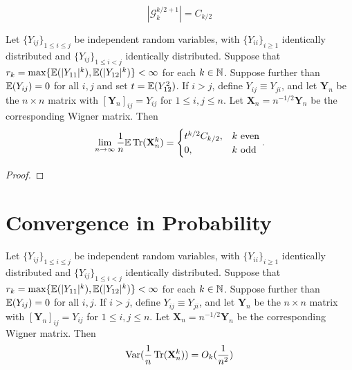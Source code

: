 \begin{proposition}
    \notready
    \label{prop:graph_Catalan_number}
  \[|\mathcal{G}^{k/2 + 1}_k| = C_{k/2}\]
\end{proposition}



%
%
%
%
%
%
%
%


\begin{proposition}
  \label{prop:matrix_moments_convergence}
  \notready
  Let $\{Y_{ij}\}_{1\le i\le j}$ be independent random variables, with $\{Y_{ii}\}_{i\ge 1}$ identically distributed and $\{Y_{ij}\}_{1\le i<j}$ identically distributed.  Suppose that $r_k = \max\{\mathbb{E}(|Y_{11}|^k),\mathbb{E}(|Y_{12}|^k)\} <\infty$ for each $k\in\mathbb{N}$.  Suppose further than $\mathbb{E}(Y_{ij})=0$ for all $i,j$ and set $t=\mathbb{E}(Y_{12}^2)$.  If $i>j$, define $Y_{ij} \equiv Y_{ji}$, and let $\mathbf{Y}_n$ be the $n\times n$ matrix with $[\mathbf{Y}_n]_{ij} = Y_{ij}$ for $1\le i,j\le n$.  Let $\mathbf{X}_n = n^{-1/2}\mathbf{Y}_n$ be the corresponding Wigner matrix.  Then
\[
\lim_{n\to\infty} \frac{1}{n}\mathbb{E}\operatorname{Tr}(\mathbf{X}_n^k) = \begin{cases}
  t^{k/2}C_{k/2}, & k\text{ even} \\
  0, & k\text{ odd}
\end{cases}.
\]
\end{proposition}

\begin{proof}
\notready
\end{proof}




\section{Convergence in Probability}

\begin{proposition}
  \label{prop:matrix_moments_convergence_probability}
  \notready
  Let $\{Y_{ij}\}_{1 \leq i \leq j}$ be independent random variables, with $\{Y_{ii}\}_{i\geq 1}$ identically distributed and $\{Y_{ij}\}_{1 \leq i < j}$ identically distributed. Suppose that $r_k = \max\{\mathbb{E}(|Y_{11}|^k),\mathbb{E}(|Y_{12}|^k)\} < \infty$ for each $k\in\mathbb{N}$. Suppose further than $\mathbb{E}(Y_{ij})=0$ for all $i,j$. If $i>j$, define $Y_{ij} \equiv Y_{ji}$, and let $\mathbf{Y}_n$ be the $n\times n$ matrix with $[\mathbf{Y}_n]_{ij} = Y_{ij}$ for $1\le i,j\le n$. Let $\mathbf{X}_n = n^{-1/2}\mathbf{Y}_n$ be the corresponding Wigner matrix. Then
  $$
  \operatorname{Var}(\frac{1}{n}\operatorname{Tr}(\mathbf{X}_{n}^{k})) = O_{k}(\frac{1}{n^2})
  $$ 
\end{proposition}







